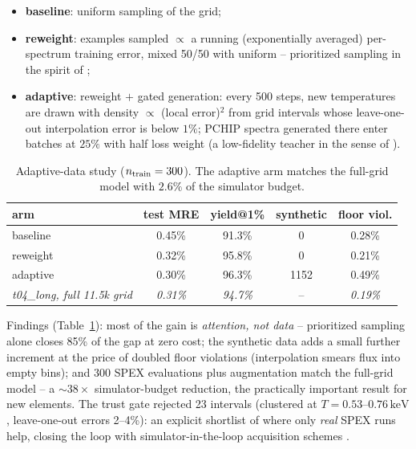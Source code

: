 \documentclass[11pt,a4paper]{article}
\newcommand{\kev}{\,\mathrm{keV}}
\begin{document}
\begin{itemize}
\item \textbf{baseline}: uniform sampling of the grid;
\item \textbf{reweight}: examples sampled $\propto$ a running
      (exponentially averaged) per-spectrum training error, mixed 50/50
      with uniform -- prioritized sampling in the spirit of
      \citet{schaul16};
\item \textbf{adaptive}: reweight $+$ gated generation: every 500 steps,
      new temperatures are drawn with density $\propto$ (local error)$^2$
      \citep[RAD;][]{wu23} from grid intervals whose leave-one-out
      interpolation error \citep[cf.\ CV-Voronoi;][]{liu18} is below
      $1\%$; PCHIP spectra generated there enter batches at $25\%$
      with half loss weight (a low-fidelity teacher in the sense of
      \citealt{kennedy00}).
\end{itemize}

\begin{table}[ht]
\centering
\begin{tabular}{lcccc}
\toprule
arm & test MRE & yield@1\% & synthetic & floor viol.\\
\midrule
baseline & 0.45\% & 91.3\% & 0 & 0.28\%\\
reweight & 0.32\% & 95.8\% & 0 & 0.21\%\\
adaptive & 0.30\% & 96.3\% & 1152 & 0.49\%\\
\midrule
\emph{t04\_long, full 11.5k grid} & \emph{0.31\%} & \emph{94.7\%} &
-- & \emph{0.19\%}\\
\bottomrule
\end{tabular}
\caption{Adaptive-data study ($n_{\rm train}=300$). The adaptive arm
matches the full-grid model with $2.6\%$ of the simulator budget.}
\label{tab:adaptive}
\end{table}

Findings (Table~\ref{tab:adaptive}): most of the gain is
\emph{attention, not data} -- prioritized sampling alone closes 85\% of
the gap at zero cost; the synthetic data adds a small further increment
at the price of doubled floor violations (interpolation smears flux
into empty bins); and 300 SPEX evaluations plus augmentation match the
full-grid model -- a $\sim38\times$ simulator-budget reduction, the
practically important result for new elements. The trust gate rejected
23 intervals (clustered at $T=0.53$--$0.76\kev$, leave-one-out errors
2--4\%): an explicit shortlist of where only \emph{real} SPEX runs
help, closing the loop with simulator-in-the-loop acquisition schemes
\citep{nygaard23,rogers19}.
\end{document}
